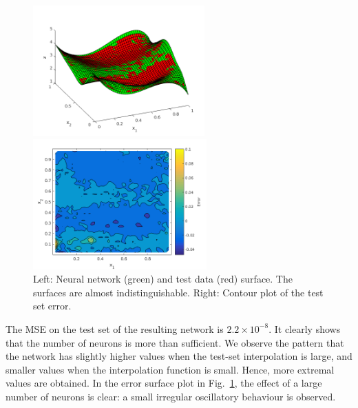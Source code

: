 \documentclass[pdftex,11pt,a4paper]{article}
\begin{document}

\begin{figure}[bth]
\centering
\begin{minipage}{0.5\textwidth}
\includegraphics[height=5cm]{figs/NN_and_testsurf.png}
\end{minipage}%
\begin{minipage}{0.5\textwidth}
\includegraphics[height=5cm]{figs/NN_test_error.png}
\end{minipage}%
\caption{Left: Neural network (green) and test data (red) surface. The surfaces are almost indistinguishable. Right: Contour plot of the test set error. \label{fig:NN_and_testsurf}}
\end{figure}

The MSE on the test set of the resulting network is $2.2 \times 10^{-8}$. It clearly shows that the number of neurons is more than sufficient. We observe the pattern that the network has slightly higher values when the test-set interpolation is large, and smaller values when the interpolation function is small. Hence, more extremal values are obtained.
In the error surface plot in Fig.~\ref{fig:NN_and_testsurf}, the effect of a large number of neurons is clear: a small irregular oscillatory behaviour is observed.
\end{document}
